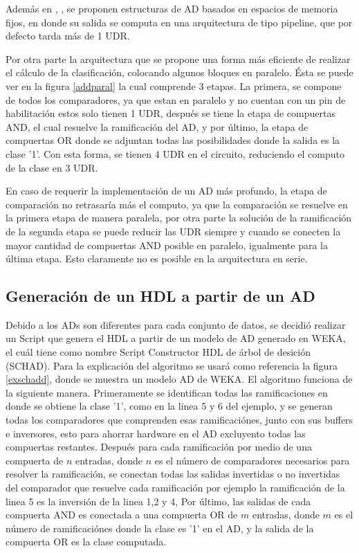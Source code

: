 \documentclass[twoside,spanish,ESP,MSc]{plantillaLabUPV}
\theoremstyle{definition}
\begin{document}
Además en \cite{ad4}, \cite{ad5}, \cite{ad6} se proponen estructuras de AD basados en espacios de memoria fijos, en donde su salida se computa en una arquitectura de tipo pipeline, que por defecto tarda más de 1 UDR.

Por otra parte la arquitectura que se propone una forma más eficiente de realizar el cálculo de la clasificación, colocando algunos bloques en paralelo. Ésta se puede ver en la figura \ref{addparal} la cual comprende 3 etapas. La primera, se compone de todos los comparadores, ya que estan en paralelo y no cuentan con un pin de habilitación estos solo tienen 1 UDR, después se tiene la etapa de compuertas AND, el cual resuelve la ramificación del AD, y por último, la etapa de compuertas OR donde se adjuntan todas las posibilidades donde la salida es la clase '1'. Con esta forma, se tienen 4 UDR en el circuito, reduciendo el computo de la clase en 3 UDR.

En caso de requerir la implementación de un AD más profundo, la etapa de comparación no retrasaría más el computo, ya que la comparación se resuelve en la primera etapa de manera paralela, por otra parte la solución de la ramificación de la segunda etapa se puede reducir las UDR siempre y cuando se conecten la mayor cantidad de compuertas AND posible en paralelo, igualmente para la última etapa. Esto claramente no es posible en la arquitectura en serie.


\subsection{Generación de un HDL a partir de un AD}
Debido a los ADs son diferentes para cada conjunto de datos, se decidió realizar un Script que genera el HDL a partir de un modelo de AD generado en WEKA, el cuál tiene como nombre Script Constructor HDL de árbol de desición (SCHAD). Para la explicación del algoritmo se usará como referencia la figura \ref{exschadd}, donde se muestra un modelo AD de WEKA. El algoritmo funciona de la siguiente manera. Primeramente se identifican todas las ramificaciones en donde se obtiene la clase '1', como en la linea 5 y 6 del ejemplo, y se generan todas los comparadores que comprenden esas ramificaciónes, junto con sus buffers e inversores, esto para ahorrar hardware en el AD excluyento todas las compuertas restantes. Después para cada ramificación por medio de una compuerta de $n$ entradas, donde $n$ es el número de comparadores necesarios para resolver la ramificación, se conectan todas las salidas invertidas o no invertidas del comparador que resuelve cada ramificación por ejemplo la ramificación de la linea 5 es la inversión de la linea 1,2 y 4, Por último, las salidas de cada compuerta AND es conectada a una compuerta OR de $m$ entradas, donde $m$ es el número de ramificaciónes donde la clase es '1' en el AD, y la salida de la compuerta OR es la clase computada.
 
\end{document}
